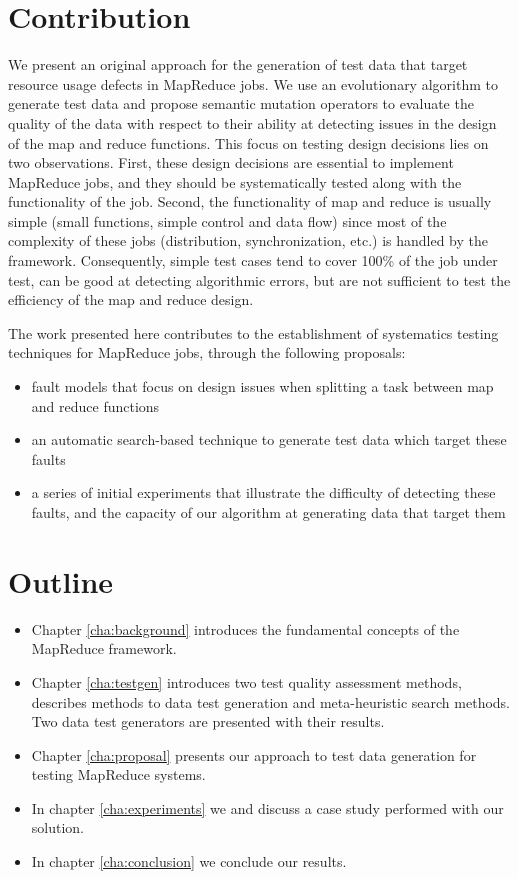 \section{Contribution}

We present an original approach for the generation of test data that target resource usage defects in MapReduce jobs. We use an evolutionary algorithm to generate test data and propose semantic mutation operators to evaluate the quality of the data with respect to their ability at detecting issues in the design of the map and reduce functions. This focus on testing design decisions lies on two observations. First, these design decisions are essential to implement MapReduce jobs, and they should be systematically tested along with the functionality of the job. Second, the functionality of map and reduce is usually simple (small functions, simple control and data flow) since most of the complexity of these jobs (distribution, synchronization, etc.) is handled by the framework. Consequently, simple test cases tend to cover 100\% of the job under test, can be good at detecting algorithmic errors, but are not sufficient to test the efficiency of the map and reduce design. 

The work presented here contributes to the establishment of systematics testing techniques for MapReduce jobs, through the following proposals:
\begin{itemize}
	\item fault models that focus on design issues when splitting a task between map and reduce functions
	\item an automatic search-based technique to generate test data which target these faults
	\item a series of initial experiments that illustrate the difficulty of detecting these faults, and the capacity of our algorithm at generating data that target them
\end{itemize} 

\section{Outline}

\begin{itemize}
	\item Chapter \ref{cha:background} introduces the  fundamental concepts of the MapReduce framework.
	\item Chapter \ref{cha:testgen} introduces two test quality assessment methods, describes methods to data test generation and 
	      meta-heuristic search methods. Two data test generators are presented with their results.
	\item Chapter \ref{cha:proposal} presents our approach to test data generation for testing MapReduce systems.
	\item In chapter \ref{cha:experiments} we and discuss a case study performed with our solution.
	\item In chapter \ref{cha:conclusion} we conclude our results.
\end{itemize}

